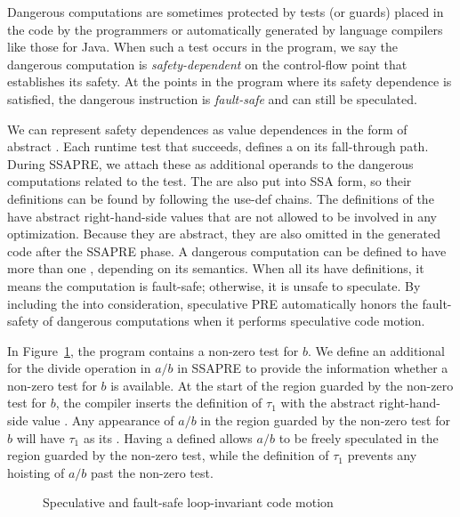 Dangerous computations are sometimes protected by tests (or guards) placed in the code by the programmers or automatically generated by language compilers like those for Java. 
When such a test occurs in the program, we say the dangerous computation is \emph{safety-dependent} on the control-flow point that establishes its safety. 
At the points in the program where its safety dependence is satisfied, the dangerous instruction is \emph{fault-safe} and can still be speculated.

We can represent safety dependences as value dependences in the form of abstract \tauvars. 
Each runtime test that succeeds, defines a \tauvar on its fall-through path. 
During SSAPRE, we attach these \tauvars as additional operands to the dangerous computations related to the test. 
The \tauvars are also put into SSA form, so their definitions can be found by following the use-def chains. 
The definitions of the \tauvars have abstract right-hand-side values that are not allowed to be involved in any optimization. 
Because they are abstract, they are also omitted in the generated code after the SSAPRE phase. 
A dangerous computation can be defined to have more than one \tauop, depending on its semantics. 
When all its \tauops have definitions, it means the computation is fault-safe; 
otherwise, it is unsafe to speculate. 
By including the \tauops into consideration, speculative PRE automatically honors the fault-safety of dangerous computations when it performs speculative code motion.

In Figure~\ref{fig:spec-div}, the program contains a non-zero test for $b$. 
We define an additional \tauop for the divide operation in $a/b$ in SSAPRE to provide the information whether a non-zero test for $b$ is available. 
At the start of the region guarded by the non-zero test for $b$, the compiler inserts the definition of $\tau_1$ with the abstract right-hand-side value \tauedge. 
Any appearance of $a/b$ in the region guarded by the non-zero test for $b$ will have $\tau_1$ as its \tauop. 
Having a defined \tauop allows $a/b$ to be freely speculated in the region guarded by the non-zero test, while the definition of $\tau_1$ prevents any hoisting of $a/b$ past the non-zero test.

\begin{figure}
\centering
\hspace{1cm}
\caption{Speculative and fault-safe loop-invariant code motion}
\label{fig:spec-div}
\end{figure}

